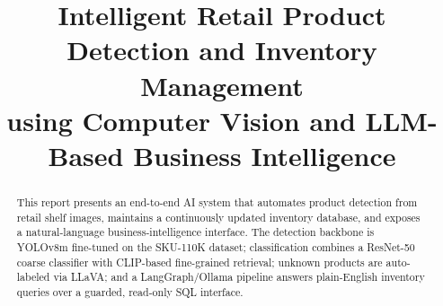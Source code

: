 \documentclass[conference]{IEEEtran}
\title{Intelligent Retail Product Detection and Inventory Management\\
using Computer Vision and LLM-Based Business Intelligence}
\author{\IEEEauthorblockN{Project Team}
\IEEEauthorblockA{2026}}
\begin{document}
\maketitle

\begin{abstract}
This report presents an end-to-end AI system that automates product detection from retail shelf
images, maintains a continuously updated inventory database, and exposes a natural-language
business-intelligence interface. The detection backbone is YOLOv8m fine-tuned on the SKU-110K
dataset; classification combines a ResNet-50 coarse classifier with CLIP-based fine-grained
retrieval; unknown products are auto-labeled via LLaVA; and a LangGraph/Ollama pipeline answers
plain-English inventory queries over a guarded, read-only SQL interface.
\end{abstract}











\end{document}
